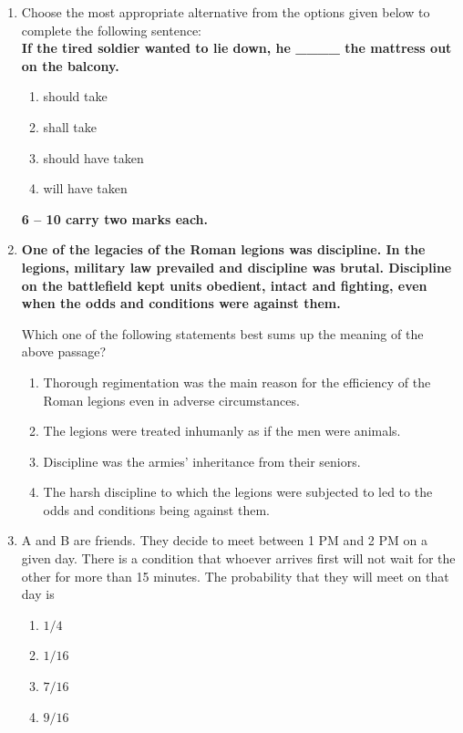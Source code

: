 \documentclass[journal,12pt,onecolumn]{IEEEtran}
\begin{document}
\begin{enumerate}[label=\arabic*.]
\item Choose the most appropriate alternative from the options given below to complete the following sentence:\\
\textbf{If the tired soldier wanted to lie down, he \_\_\_\_ the mattress out on the balcony.}
\begin{multicols}{2}
\begin{enumerate}[label=(\Alph*)]
\item should take
\item shall take
\item should have taken
\item will have taken
\end{enumerate}
\end{multicols}


\noindent \textbf{6 -- 10 carry two marks each.}

\item \textbf{One of the legacies of the Roman legions was discipline. In the legions, military law prevailed and discipline was brutal. Discipline on the battlefield kept units obedient, intact and fighting, even when the odds and conditions were against them.}

Which one of the following statements best sums up the meaning of the above passage?
\begin{enumerate}[label=(\Alph*)]
\item Thorough regimentation was the main reason for the efficiency of the Roman legions even in adverse circumstances.
\item The legions were treated inhumanly as if the men were animals.
\item Discipline was the armies’ inheritance from their seniors.
\item The harsh discipline to which the legions were subjected to led to the odds and conditions being against them.
\end{enumerate}

\item A and B are friends. They decide to meet between 1 PM and 2 PM on a given day. There is a condition that whoever arrives first will not wait for the other for more than 15 minutes. The probability that they will meet on that day is
\begin{multicols}{2}
\begin{enumerate}[label=(\Alph*)]
\item $1/4$
\item $1/16$
\item $7/16$
\item $9/16$
\end{enumerate}
\end{multicols}


\end{enumerate}
\end{document}
